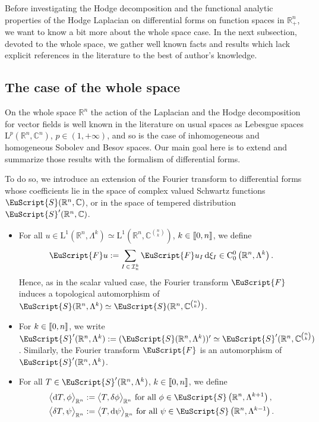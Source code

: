 \documentclass[10pt]{amsart}
\theoremstyle{definition}\newtheorem{defi}[theo]{Definition}\newtheorem{rema}[theo]{Remark}\newtheorem{exam}[theo]{Example}\newtheorem{exem}[theo]{Example}\newtheorem{nota}[theo]{Notation}
\newcommand{\bbR}{\mathbb{R}}
\newcommand{\bbC}{\mathbb{C}}
\newcommand{\rmd}{\mathrm{d}}
\newcommand{\rmL}{\mathrm{L}}
\newcommand{\rmC}{\mathrm{C}}
\newcommand{\clI}{\mathcal{I}}
\newcommand{\eus}{\EuScript}
\newcommand{\llbracket}{\mathopen{[\mkern -2.7mu[}}
\newcommand{\rrbracket}{\mathclose{]\mkern -2.7mu]}}
\newcommand{\llb}{\llbracket}
\newcommand{\rrb}{\rrbracket}
\begin{document}
Before investigating the Hodge decomposition and the functional analytic properties of the Hodge Laplacian on differential forms on function spaces in $\bbR^n_+$, we want to know a bit more about the whole space case. In the next subsection, devoted to the whole space, we gather well known facts and results which lack explicit references in the literature to the best of author's knowledge.

\subsection{The case of the whole space}

On the whole space $\bbR^n$ the action of the Laplacian and the Hodge decomposition for vector fields is well known in the literature on usual spaces as Lebesgue spaces $\rmL^p(\bbR^n,\bbC^n)$, $p\in(1,+\infty)$, and so is the case of inhomogeneous and homogeneous Sobolev and Besov spaces. Our main goal here is to extend and summarize those results with the formalism of differential forms.

To do so, we introduce an extension of the Fourier transform to differential forms whose coefficients lie in the space of complex valued Schwartz functions $\eus{S}(\bbR^n,\bbC)$, or in the space of tempered distribution $\eus{S}'(\bbR^n,\bbC)$.
\begin{itemize}
\item For all $u\in \rmL^1(\bbR^n,\Lambda^k)\simeq \rmL^1(\bbR^n,\bbC^{\binom{n}{k}})$, $k\in\llb 0,n\rrb$, we define
\begin{align*}
\eus{F}u:=\sum\limits_{I\,\in\,\clI^k_n} \eus{F}u_{I} \,\rmd\xi_I \in \rmC^0_{0}\left(\bbR^n,\Lambda^k\right).
\end{align*}
Hence, as in the scalar valued case, the Fourier transform $\eus{F}$ induces a topological automorphism of $\eus{S}(\bbR^n,\Lambda^k)\simeq \eus{S}(\bbR^n,\bbC^{\binom{n}{k}})$.
\item For $k\in\llb 0,n\rrb$, we write $\eus{S}'(\bbR^n,\Lambda^k):= (\eus{S}(\bbR^n,\Lambda^k))'\simeq \eus{S}'(\bbR^n,\bbC^{\binom{n}{k}})$. Similarly, the Fourier transform $\eus{F}$ is an automorphism of $\eus{S}'(\bbR^n,\Lambda^k)$.
\item For all $T\in \eus{S}'(\bbR^n,\Lambda^k)$, $k\in\llb 0,n\rrb$, we define
\begin{align*}
\big\langle \rmd T, \phi \big\rangle_{\bbR^n} &:= \big\langle T, {\delta}\phi \big\rangle_{\bbR^n} \text{ for all }\phi \in \eus{S}\left(\bbR^{n},\Lambda^{k+1}\right),\\
\big\langle {\delta}T, \psi \big\rangle_{\bbR^n} &:= \big\langle T,\rmd\psi \big\rangle_{\bbR^n} \text{ for all }\psi \in \eus{S}\left(\bbR^{n},\Lambda^{k-1}\right).
\end{align*}
\end{itemize}
\end{document}
